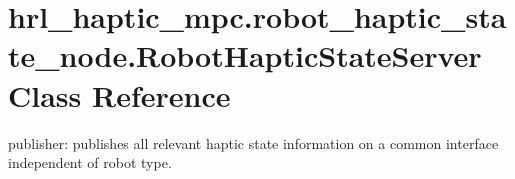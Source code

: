 \hypertarget{classhrl__haptic__mpc_1_1robot__haptic__state__node_1_1_robot_haptic_state_server}{\section{hrl\-\_\-haptic\-\_\-mpc.\-robot\-\_\-haptic\-\_\-state\-\_\-node.\-Robot\-Haptic\-State\-Server \-Class \-Reference}
\label{classhrl__haptic__mpc_1_1robot__haptic__state__node_1_1_robot_haptic_state_server}
}


publisher\-: publishes all relevant haptic state information on a common interface independent of robot type.  


